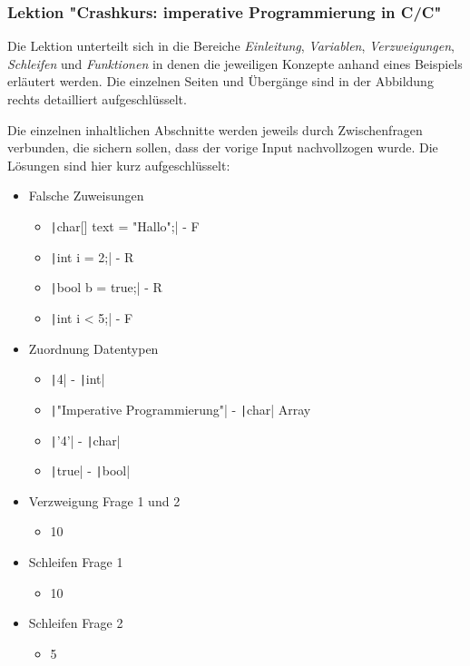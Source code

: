 \documentclass[a4paper]{article}
\def\CC{{C\nolinebreak[4]\hspace{-.05em}\raisebox{.4ex}{\tiny\bf ++}}}
\begin{document}
\subsubsection{Lektion "Crashkurs: imperative Programmierung in C/\CC"}
\begin{minipage}[b][\textheight-1.6cm][t]{0.55\textwidth}
    Die Lektion unterteilt sich in die Bereiche \emph{Einleitung}, \emph{Variablen}, \emph{Verzweigungen}, \emph{Schleifen} und \emph{Funktionen} in denen die jeweiligen Konzepte anhand eines Beispiels erläutert werden. Die einzelnen Seiten und Übergänge sind in der Abbildung rechts detailliert aufgeschlüsselt.

    Die einzelnen inhaltlichen Abschnitte werden jeweils durch Zwischenfragen verbunden, die sichern sollen, dass der vorige Input nachvollzogen wurde. Die Lösungen sind hier kurz aufgeschlüsselt:

    \begin{itemize}
        \item Falsche Zuweisungen
        \begin{itemize}
            \item \texttt|char[] text = "Hallo";| - F
            \item \texttt|int i = 2;| - R
            \item \texttt|bool b = true;| - R
            \item \texttt|int i < 5;| - F
        \end{itemize}
        \item Zuordnung Datentypen
        \begin{itemize}
            \item \texttt|4| - \texttt|int|
            \item \texttt|"Imperative Programmierung"| - \texttt|char| Array
            \item \texttt|'4'| - \texttt|char|
            \item \texttt|true| - \texttt|bool|
        \end{itemize}
        \item Verzweigung Frage 1 und 2
        \begin{itemize}
            \item 10
        \end{itemize}
        \item Schleifen Frage 1
        \begin{itemize}
            \item 10
        \end{itemize}
        \item Schleifen Frage 2
        \begin{itemize}
            \item 5
        \end{itemize}
    \end{itemize}
    

\end{minipage}
\end{document}
